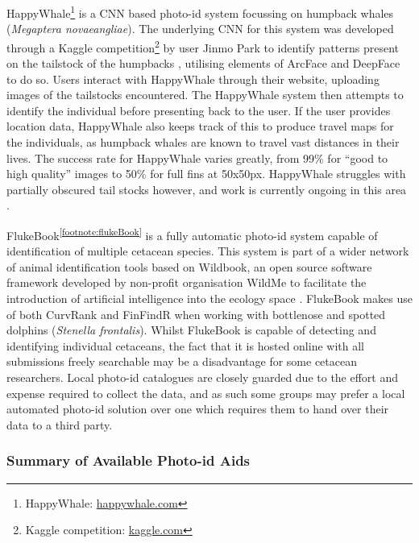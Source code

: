 HappyWhale\footnote{\label{footnote:happyWhale}HappyWhale: \href{https://happywhale.com/}{happywhale.com}} is a CNN based photo-id system focussing on humpback whales (\textit{Megaptera novaeangliae}). The underlying CNN for this system was developed through a Kaggle competition\footnote{Kaggle competition: \href{https://www.kaggle.com/c/whale-categorization-playground}{kaggle.com}} by user Jinmo Park to identify patterns present on the tailstock of the humpbacks \cite{kaggle_humpback_2018}, utilising elements of ArcFace \cite{deng_arcface_2019} and DeepFace \cite{taigman_deepface_2014} to do so. Users interact with HappyWhale through their website, uploading images of the tailstocks encountered. The HappyWhale system then attempts to identify the individual before presenting back to the user. If the user provides location data, HappyWhale also keeps track of this to produce travel maps for the individuals, as humpback whales are known to travel vast distances in their lives. The success rate for HappyWhale varies greatly, from 99\% for ``good to high quality'' images to 50\% for full fins at 50x50px. HappyWhale struggles with partially obscured tail stocks however, and work is currently ongoing in this area \cite{cheeseman_happywhale_2019}. 

FlukeBook\textsuperscript{\ref{footnote:flukeBook}} is a fully automatic photo-id system capable of identification of multiple cetacean species. This system is part of a wider network of animal identification tools based on Wildbook, an open source software framework developed by non-profit organisation WildMe to facilitate the introduction of artificial intelligence into the ecology space \cite{berger-wolf_wildbook:_2017}. FlukeBook makes use of both CurvRank and FinFindR when working with bottlenose and spotted dolphins (\textit{Stenella frontalis}). Whilst FlukeBook is capable of detecting and identifying individual cetaceans, the fact that it is hosted online with all submissions freely searchable may be a disadvantage for some cetacean researchers. Local photo-id catalogues are closely guarded due to the effort and expense required to collect the data, and as such some groups may prefer a local automated photo-id solution over one which requires them to hand over their data to a third party. 

\subsubsection{Summary of Available Photo-id Aids}\label{ch:Background,sec:conTech,sub:photoIDAides,subsub:Summary}

